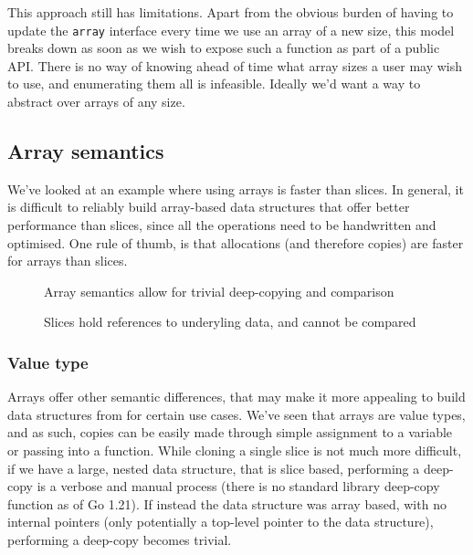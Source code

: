 
This approach still has limitations. Apart from the obvious burden of having to
update the \texttt{array} interface every time we use an array of a new size,
this model breaks down as soon as we wish to expose such a function as part of a
public API. There is no way of knowing ahead of time what array sizes a user may
wish to use, and enumerating them all is infeasible. Ideally we'd want a way to
abstract over arrays of any size.


\subsection{Array semantics}

We've looked at an example where using arrays is faster than slices. In general,
it is difficult to reliably build array-based data structures that offer better
performance than slices, since all the operations need to be handwritten and
optimised. One rule of thumb, is that allocations (and therefore copies) are
faster for arrays than slices.

\begin{figure}
	\caption{Array semantics allow for trivial deep-copying and comparison}
\end{figure}

\begin{figure}
	\caption{Slices hold references to underyling data, and cannot be compared}
\end{figure}

\subsubsection{Value type}

Arrays offer other semantic differences, that may make it more appealing to
build data structures from for certain use cases. We've seen that arrays are
value types, and as such, copies can be easily made through simple assignment to
a variable or passing into a function. While cloning a single slice is not much
more difficult, if we have a large, nested data structure, that is slice based,
performing a deep-copy is a verbose and manual process (there is no standard
library deep-copy function as of Go 1.21). If instead the data structure was
array based, with no internal pointers (only potentially a top-level pointer to
the data structure), performing a deep-copy becomes trivial.

